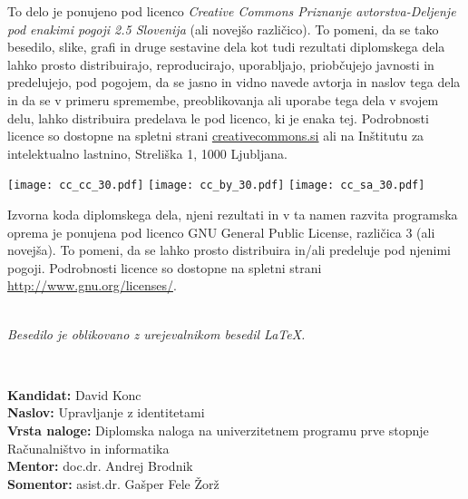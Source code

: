 \documentclass[a4paper,12pt,openright]{book}
\newcommand{\clearemptydoublepage}{\newpage{\pagestyle{empty}\cleardoublepage}}
\newcommand{\CcImageCc}[1]{%
	\texttt{[image: cc\_cc\_30.pdf]}%
}
\newcommand{\CcImageBy}[1]{%
	\texttt{[image: cc\_by\_30.pdf]}%
}
\newcommand{\CcImageSa}[1]{%
	\texttt{[image: cc\_sa\_30.pdf]}%
}
\begin{document}
\newpage
\thispagestyle{empty}

\vspace*{5cm}
{\small \noindent
To delo je ponujeno pod licenco \textit{Creative Commons Priznanje avtorstva-Deljenje pod enakimi pogoji 2.5 Slovenija} (ali novej\v so razli\v cico).
To pomeni, da se tako besedilo, slike, grafi in druge sestavine dela kot tudi rezultati diplomskega dela lahko prosto distribuirajo,
reproducirajo, uporabljajo, priobčujejo javnosti in predelujejo, pod pogojem, da se jasno in vidno navede avtorja in naslov tega
dela in da se v primeru spremembe, preoblikovanja ali uporabe tega dela v svojem delu, lahko distribuira predelava le pod
licenco, ki je enaka tej.
Podrobnosti licence so dostopne na spletni strani \href{http://creativecommons.si}{creativecommons.si} ali na Inštitutu za
intelektualno lastnino, Streliška 1, 1000 Ljubljana.

\vspace*{1cm}
\begin{center}%
\CcImageCc{0.741573033707865}\hspace*{1ex}\CcImageBy{1}\hspace*{1ex}\CcImageSa{1}%
\end{center}
}

\vspace*{1cm}
{\small \noindent
Izvorna koda diplomskega dela, njeni rezultati in v ta namen razvita programska oprema je ponujena pod licenco GNU General Public License,
različica 3 (ali novejša). To pomeni, da se lahko prosto distribuira in/ali predeluje pod njenimi pogoji.
Podrobnosti licence so dostopne na spletni strani \url{http://www.gnu.org/licenses/}.
}

\vfill
\begin{center} 
\ \\ \vfill
{\em
Besedilo je oblikovano z urejevalnikom besedil \LaTeX.}
\end{center}

\clearemptydoublepage

\thispagestyle{empty}
\
\vfill

\bigskip
\noindent\textbf{Kandidat:} David Konc\\
\noindent\textbf{Naslov:} Upravljanje z identitetami\\
\noindent\textbf{Vrsta naloge:} Diplomska naloga na univerzitetnem programu prve stopnje Računalništvo in informatika \\
\noindent\textbf{Mentor:} doc.dr. Andrej Brodnik\\
\noindent\textbf{Somentor:} asist.dr. Gašper Fele Žorž
\end{document}
